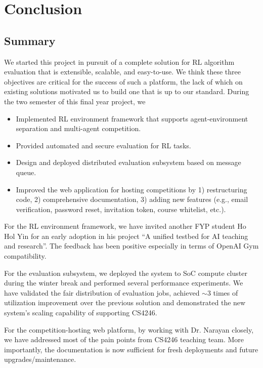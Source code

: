 \chapter{Conclusion}
\label{ch:conclusion}

\section{Summary}
\label{s:conclusion-summary}
We started this project in pursuit of a complete solution for RL algorithm evaluation that is extensible, scalable, and easy-to-use. We think these three objectives are critical for the success of such a platform, the lack of which on existing solutions motivated us to build one that is up to our standard.
During the two semester of this final year project, we
\begin{itemize}
    \item Implemented RL environment framework that supports agent-environment separation and multi-agent competition.
    \item Provided automated and secure evaluation for RL tasks.
    \item Design and deployed distributed evaluation subsystem based on message queue.
    \item Improved the web application for hosting competitions by 1) restructuring code, 2) comprehensive documentation, 3) adding new features (e.g., email verification, password reset, invitation token, course whitelist, etc.).
\end{itemize}

For the RL environment framework, we have invited another FYP student Ho Hol Yin for an early adoption in his project ``A unified testbed for AI teaching and research''. The feedback has been positive especially in terms of OpenAI Gym compatibility.

For the evaluation subsystem, we deployed the system to SoC compute cluster during the winter break and performed several performance experiments. We have validated the fair distribution of evaluation jobs, achieved $\sim$3 times of utilization improvement over the previous solution and demonstrated the new system’s scaling capability of supporting CS4246.

For the competition-hosting web platform, by working with Dr. Narayan closely, we have addressed most of the pain points from CS4246 teaching team. More importantly, the documentation is now sufficient for fresh deployments and future upgrades/maintenance.

